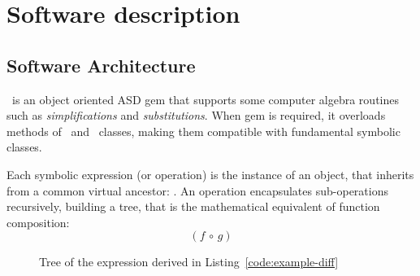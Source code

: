 
\section{Software description}
\label{sec:description}


\subsection{Software Architecture}
\label{sec:architecture}


\ragnicas~is an object oriented ASD gem that supports some computer algebra routines such as \emph{simplifications} and \emph{substitutions}. When gem is required, it overloads methods of \Fixnum~and \Float~classes, making them compatible with fundamental symbolic classes.

Each symbolic expression (or operation) is the instance of an object, that inherits from a common virtual ancestor: \CASOp. An operation encapsulates sub-operations recursively, building a tree, that is the mathematical equivalent of function composition:
\begin{equation}
\left( f \, \circ \, g \right)
\end{equation}

\begin{figure}[ht!]
\centering

\caption{\label{fig:graph}Tree of the expression derived in Listing~\ref{code:example-diff}}
\end{figure}

